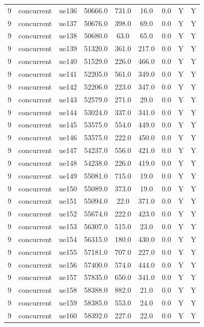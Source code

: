 \begin{table}[ht]
\begin{tabular}{|c|c|c|c|c|c|c|c|c|}
9 & concurrent & ue136 & 50666.0 & 731.0 & 16.0 & 0.0 & Y & Y \\
9 & concurrent & ue137 & 50676.0 & 398.0 & 69.0 & 0.0 & Y & Y \\
9 & concurrent & ue138 & 50680.0 & 63.0 & 65.0 & 0.0 & Y & Y \\
9 & concurrent & ue139 & 51320.0 & 361.0 & 217.0 & 0.0 & Y & Y \\
9 & concurrent & ue140 & 51529.0 & 226.0 & 466.0 & 0.0 & Y & Y \\
9 & concurrent & ue141 & 52205.0 & 561.0 & 349.0 & 0.0 & Y & Y \\
9 & concurrent & ue142 & 52206.0 & 223.0 & 347.0 & 0.0 & Y & Y \\
9 & concurrent & ue143 & 52579.0 & 271.0 & 29.0 & 0.0 & Y & Y \\
9 & concurrent & ue144 & 53024.0 & 337.0 & 341.0 & 0.0 & Y & Y \\
9 & concurrent & ue145 & 53575.0 & 554.0 & 449.0 & 0.0 & Y & Y \\
9 & concurrent & ue146 & 53575.0 & 222.0 & 450.0 & 0.0 & Y & Y \\
9 & concurrent & ue147 & 54237.0 & 556.0 & 421.0 & 0.0 & Y & Y \\
9 & concurrent & ue148 & 54238.0 & 226.0 & 419.0 & 0.0 & Y & Y \\
9 & concurrent & ue149 & 55081.0 & 715.0 & 19.0 & 0.0 & Y & Y \\
9 & concurrent & ue150 & 55089.0 & 373.0 & 19.0 & 0.0 & Y & Y \\
9 & concurrent & ue151 & 55094.0 & 22.0 & 371.0 & 0.0 & Y & Y \\
9 & concurrent & ue152 & 55674.0 & 222.0 & 423.0 & 0.0 & Y & Y \\
9 & concurrent & ue153 & 56307.0 & 515.0 & 23.0 & 0.0 & Y & Y \\
9 & concurrent & ue154 & 56315.0 & 180.0 & 430.0 & 0.0 & Y & Y \\
9 & concurrent & ue155 & 57181.0 & 707.0 & 227.0 & 0.0 & Y & Y \\
9 & concurrent & ue156 & 57400.0 & 574.0 & 444.0 & 0.0 & Y & Y \\
9 & concurrent & ue157 & 57835.0 & 650.0 & 341.0 & 0.0 & Y & Y \\
9 & concurrent & ue158 & 58388.0 & 882.0 & 21.0 & 0.0 & Y & Y \\
9 & concurrent & ue159 & 58385.0 & 553.0 & 24.0 & 0.0 & Y & Y \\
9 & concurrent & ue160 & 58392.0 & 227.0 & 22.0 & 0.0 & Y & Y \\

\end{tabular}
\end{table}
